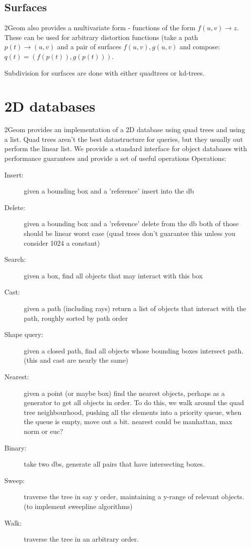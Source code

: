 \subsection{Surfaces}

2Geom also provides a multivariate form - functions of the form $f(u,v) \rightarrow z$.  These can be used for arbitrary distortion functions (take a path $p(t) \rightarrow (u,v)$ and a pair of surfaces $f(u,v),g(u,v)$ and compose: $q(t) = (f(p(t)), g(p(t)))$.

Subdivision for surfaces are done with either quadtrees or kd-trees.

\section{2D databases}

2Geom provides an implementation of a 2D database using quad trees and
using a list.  Quad trees aren't the best datastructure for queries,
but they usually out perform the linear list.  We provide a
standard interface for object databases with performance guarantees
and provide a set of useful operations Operations:

\begin{description}
\item[Insert:] given a bounding box and a 'reference' insert into the db

\item[Delete:] given a bounding box and a 'reference' delete from the db
both of those should be linear worst case
(quad trees don't guarantee this unless you consider 1024 a constant)

\item[Search:] given a box, find all objects that may interact with this box

\item[Cast:] given a path (including rays) return a list of objects that interact with the path, roughly sorted by path order

\item[Shape query:] given a closed path, find all objects whose bounding boxes intersect path.  (this and cast are nearly the same)

\item[Nearest:] given a point (or maybe box) find the nearest objects, perhaps as a generator to get all objects in order.  To do this, we walk around the quad tree neighbourhood, pushing all the elements into a priority queue, when the queue is empty, move out a bit.  nearest could be manhattan, max norm or euc?

\item[Binary:] take two dbs, generate all pairs that have intersecting boxes.

\item[Sweep:] traverse the tree in say y order, maintaining a y-range of relevant objects. (to implement sweepline algorithms)

\item[Walk:] traverse the tree in an arbitrary order.

\end{description}


